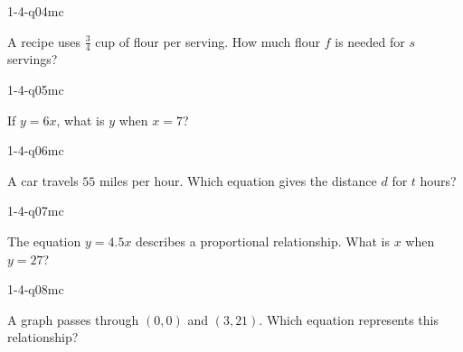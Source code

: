 \begin{practiceQuestion}{1-4-q04}{mc}
\begin{questionText}
A recipe uses $\frac{3}{4}$ cup of flour per serving. How much flour $f$ is needed for $s$ servings?
\end{questionText}
\end{practiceQuestion}

\begin{practiceQuestion}{1-4-q05}{mc}
\begin{questionText}
If $y = 6x$, what is $y$ when $x = 7$?
\end{questionText}
\end{practiceQuestion}

\begin{practiceQuestion}{1-4-q06}{mc}
\begin{questionText}
A car travels $55$ miles per hour. Which equation gives the distance $d$ for $t$ hours?
\end{questionText}
\end{practiceQuestion}

\begin{practiceQuestion}{1-4-q07}{mc}
\begin{questionText}
The equation $y = 4.5x$ describes a proportional relationship. What is $x$ when $y = 27$?
\end{questionText}
\end{practiceQuestion}

\begin{practiceQuestion}{1-4-q08}{mc}
\begin{questionText}
A graph passes through $(0, 0)$ and $(3, 21)$. Which equation represents this relationship?
\end{questionText}
\end{practiceQuestion}

